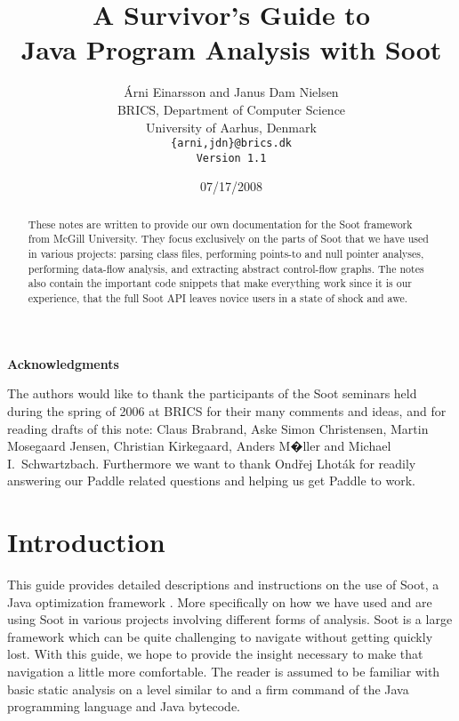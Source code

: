 \documentclass{article}
\begin{document}
\title{A Survivor's Guide to\\ Java Program Analysis with Soot}
\author{
\normalsize{}\'{A}rni Einarsson and Janus Dam Nielsen\\
\normalsize{}BRICS, Department of Computer Science\\
\normalsize{}University of Aarhus, Denmark\\
\texttt{\normalsize{}\texttt{\{arni,jdn\}@brics.dk}}\\
\normalsize{}\texttt{Version 1.1}
}
\date{07/17/2008}
\maketitle

\begin{abstract}
  These notes are written to provide our own documentation for the
  Soot framework from McGill University.  They focus exclusively on
  the parts of Soot that we have used in various projects: parsing
  class files, performing points-to and null pointer analyses,
  performing data-flow analysis, and extracting abstract control-flow
  graphs. The notes also contain the important code snippets that make
  everything work since it is our experience, that the full Soot API
  leaves novice users in a state of shock and awe.
\end{abstract}

\newpage

\tableofcontents

\newpage
{}
\begin{center}
        \textbf{Acknowledgments}
\end{center}
The authors would like to thank the participants of the Soot seminars
held during the spring of 2006 at BRICS for their many comments and
ideas, and for reading drafts of this note: Claus Brabrand, Aske Simon
Christensen, Martin Mosegaard Jensen, Christian Kirkegaard, Anders
M�ller and Michael I.\ Schwartzbach. Furthermore we want to thank
Ond\v rej Lhot\'ak for readily answering our Paddle related questions
and helping us get Paddle to work.

\newpage
\newpage

\section{Introduction}

This guide provides detailed descriptions and instructions on the use
of Soot, a Java optimization framework \cite{vall99soot}. More
specifically on how we have used and are using Soot in various
projects involving different forms of analysis. Soot is a large
framework which can be quite challenging to navigate without getting
quickly lost. With this guide, we hope to provide the insight
necessary to make that navigation a little more comfortable. The
reader is assumed to be familiar with basic static analysis on a level
similar to \cite{sanote} and a firm command of the Java programming
language and Java bytecode.
\end{document}
